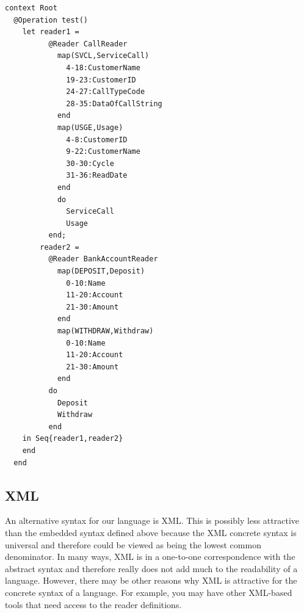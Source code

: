 \begin{lstlisting}
context Root
  @Operation test()
    let reader1 =
          @Reader CallReader
            map(SVCL,ServiceCall)
              4-18:CustomerName
              19-23:CustomerID
              24-27:CallTypeCode
              28-35:DataOfCallString
            end
            map(USGE,Usage)
              4-8:CustomerID
              9-22:CustomerName
              30-30:Cycle
              31-36:ReadDate
            end
            do 
              ServiceCall
              Usage
          end;
        reader2 =
          @Reader BankAccountReader
            map(DEPOSIT,Deposit)
              0-10:Name
              11-20:Account
              21-30:Amount
            end
            map(WITHDRAW,Withdraw)
              0-10:Name
              11-20:Account
              21-30:Amount
            end
          do
            Deposit
            Withdraw
          end
    in Seq{reader1,reader2}
    end    
  end
\end{lstlisting}

\subsection{XML}

An alternative syntax for our language is XML. This is possibly 
less attractive than the embedded syntax defined above because 
the XML concrete syntax is universal and therefore could be viewed 
as being the lowest common denominator. In many ways, XML is in a 
one-to-one correspondence with the abstract syntax and therefore 
really does not add much to the readability of a language. However, 
there may be other reasons why XML is attractive for the concrete 
syntax of a language. For example, you may have other XML-based tools 
that need access to the reader definitions.

